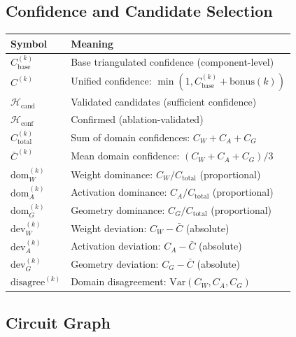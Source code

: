 \documentclass[11pt]{article}
\begin{document}
\subsection{Confidence and Candidate Selection}
\label{app:notation-confidence-candidate-selection}

\begin{center}
\begin{tabular}{ll}
\toprule
\textbf{Symbol} & \textbf{Meaning} \\
\midrule
$C^{(k)}_{\text{base}}$ & Base triangulated confidence (component-level) \\
$C^{(k)}$ & Unified confidence: $\min(1, C^{(k)}_{\text{base}} + \text{bonus}(k))$ \\
$\mathcal{H}_{\text{cand}}$ & Validated candidates (sufficient confidence) \\
$\mathcal{H}_{\text{conf}}$ & Confirmed (ablation-validated) \\
\midrule
$C_{\text{total}}^{(k)}$ & Sum of domain confidences: $C_W + C_A + C_G$ \\
$\bar{C}^{(k)}$ & Mean domain confidence: $(C_W + C_A + C_G)/3$ \\
$\text{dom}_W^{(k)}$ & Weight dominance: $C_W / C_{\text{total}}$ (proportional) \\
$\text{dom}_A^{(k)}$ & Activation dominance: $C_A / C_{\text{total}}$ (proportional) \\
$\text{dom}_G^{(k)}$ & Geometry dominance: $C_G / C_{\text{total}}$ (proportional) \\
$\text{dev}_W^{(k)}$ & Weight deviation: $C_W - \bar{C}$ (absolute) \\
$\text{dev}_A^{(k)}$ & Activation deviation: $C_A - \bar{C}$ (absolute) \\
$\text{dev}_G^{(k)}$ & Geometry deviation: $C_G - \bar{C}$ (absolute) \\
$\text{disagree}^{(k)}$ & Domain disagreement: $\text{Var}(C_W, C_A, C_G)$ \\
\bottomrule
\end{tabular}
\end{center}

\subsection{Circuit Graph}
\label{app:notation-circuit-graph}
\end{document}
